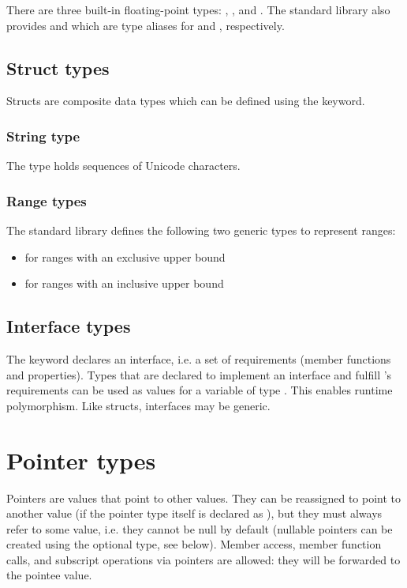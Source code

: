 There are three built-in floating-point types: , ,
and . The standard library also provides  and
 which are type aliases for  and ,
respectively.

\subsection{Struct types}

Structs are composite data types which can be defined using the 
keyword.

\subsubsection{String type}

The type  holds sequences of Unicode characters.

\subsubsection{Range types}

The standard library defines the following two generic types to represent
ranges:

\begin{itemize}
\item {} for ranges with an exclusive upper bound
\item {} for ranges with an inclusive upper bound
\end{itemize}

\subsection{Interface types}

The  keyword declares an interface, i.e. a set of requirements
(member functions and properties). Types that are declared to implement an
interface  and fulfill 's requirements can be used as values for
a variable of type . This enables runtime polymorphism. Like structs,
interfaces may be generic.

\section{Pointer types}

Pointers are values that point to other values. They can be reassigned to point
to another value (if the pointer type itself is declared as ), but
they must always refer to some value, i.e. they cannot be null by default
(nullable pointers can be created using the optional type, see below). Member
access, member function calls, and subscript operations via pointers are
allowed: they will be forwarded to the pointee value.

